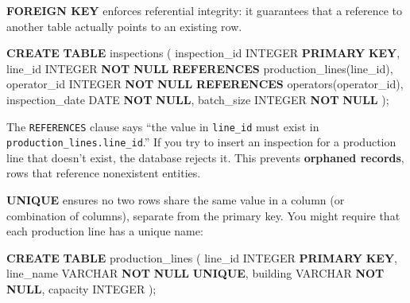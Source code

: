 \documentclass[
  letterpaper,
  DIV=11,
  numbers=noendperiod]{scrreprt}
\newenvironment{Shaded}{\begin{snugshade}}{\end{snugshade}}
\newcommand{\DataTypeTok}[1]{\textcolor[rgb]{0.68,0.00,0.00}{#1}}
\newcommand{\KeywordTok}[1]{\textcolor[rgb]{0.00,0.23,0.31}{\textbf{#1}}}
\newcommand{\NormalTok}[1]{\textcolor[rgb]{0.00,0.23,0.31}{#1}}
\begin{document}
\textbf{FOREIGN KEY} enforces referential integrity: it guarantees that
a reference to another table actually points to an existing row.

\begin{codelisting}

\caption{\texttt{duckdb}}

\begin{Shaded}
\begin{Highlighting}[]
\KeywordTok{CREATE} \KeywordTok{TABLE}\NormalTok{ inspections (}
\NormalTok{    inspection\_id   }\DataTypeTok{INTEGER} \KeywordTok{PRIMARY} \KeywordTok{KEY}\NormalTok{,}
\NormalTok{    line\_id         }\DataTypeTok{INTEGER} \KeywordTok{NOT} \KeywordTok{NULL} \KeywordTok{REFERENCES}\NormalTok{ production\_lines(line\_id),}
\NormalTok{    operator\_id     }\DataTypeTok{INTEGER} \KeywordTok{NOT} \KeywordTok{NULL} \KeywordTok{REFERENCES}\NormalTok{ operators(operator\_id),}
\NormalTok{    inspection\_date }\DataTypeTok{DATE} \KeywordTok{NOT} \KeywordTok{NULL}\NormalTok{,}
\NormalTok{    batch\_size      }\DataTypeTok{INTEGER} \KeywordTok{NOT} \KeywordTok{NULL}
\NormalTok{);}
\end{Highlighting}
\end{Shaded}

\end{codelisting}

The \texttt{REFERENCES} clause says ``the value in \texttt{line\_id}
must exist in \texttt{production\_lines.line\_id}.'' If you try to
insert an inspection for a production line that doesn't exist, the
database rejects it. This prevents \textbf{orphaned records}, rows that
reference nonexistent entities.

\textbf{UNIQUE} ensures no two rows share the same value in a column (or
combination of columns), separate from the primary key. You might
require that each production line has a unique name:

\begin{codelisting}

\caption{\texttt{duckdb}}

\begin{Shaded}
\begin{Highlighting}[]
\KeywordTok{CREATE} \KeywordTok{TABLE}\NormalTok{ production\_lines (}
\NormalTok{    line\_id   }\DataTypeTok{INTEGER} \KeywordTok{PRIMARY} \KeywordTok{KEY}\NormalTok{,}
\NormalTok{    line\_name }\DataTypeTok{VARCHAR} \KeywordTok{NOT} \KeywordTok{NULL} \KeywordTok{UNIQUE}\NormalTok{,}
\NormalTok{    building  }\DataTypeTok{VARCHAR} \KeywordTok{NOT} \KeywordTok{NULL}\NormalTok{,}
\NormalTok{    capacity  }\DataTypeTok{INTEGER}
\NormalTok{);}
\end{Highlighting}
\end{Shaded}

\end{codelisting}
\end{document}
